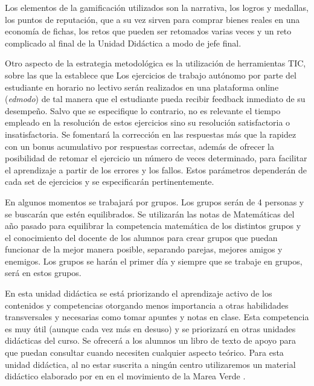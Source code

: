 Los elementos de la gamificación utilizados son la narrativa, los logros y medallas, los puntos de reputación, que a su vez sirven para comprar bienes reales en una economía de fichas, los retos que pueden ser retomados varias veces y un reto complicado al final de la Unidad Didáctica a modo de jefe final.



Otro aspecto de la estrategia metodológica es la utilización de herramientas \gls{TIC}, sobre las que la \lomce establece que 
%
Los ejercicios de trabajo autónomo por parte del estudiante en horario no lectivo serán realizados en una plataforma online (\textit{edmodo}) de tal manera que el estudiante pueda recibir feedback inmediato de su desempeño.
%
Salvo que se especifique lo contrario, no es relevante el tiempo empleado en la resolución de estos ejercicios sino su resolución satisfactoria o insatisfactoria.
%
Se fomentará la corrección en las respuestas más que la rapidez con un bonus acumulativo por respuestas correctas, además de ofrecer la posibilidad de retomar el ejercicio un número de veces determinado, para facilitar el aprendizaje a partir de los errores y los fallos.
%
Estos parámetros dependerán de cada set de ejercicios y se especificarán pertinentemente.

En algunos momentos se trabajará por grupos.
%
Los grupos serán de 4 personas y se buscarán que estén equilibrados.
%
Se utilizarán las notas de Matemáticas del año pasado para equilibrar la competencia matemática de los distintos grupos y el conocimiento del docente de los alumnos para crear grupos que puedan funcionar de la mejor manera posible, separando parejas, mejores amigos y enemigos.
%
\label{grupos}
%
Los grupos se harán el primer día y siempre que se trabaje en grupos, será en estos grupos.

En esta unidad didáctica se está priorizando el aprendizaje activo de los contenidos y competencias otorgando menos importancia a otras habilidades transversales y necesarias como tomar apuntes y notas en clase. 
%
Esta competencia es muy útil (aunque cada vez más en desuso) y se priorizará en otras unidades didácticas del curso. 
%
Se ofrecerá a los alumnos un libro de texto de apoyo para que puedan consultar cuando necesiten cualquier aspecto teórico.
%
Para esta unidad didáctica, al no estar suscrita a ningún centro utilizaremos un material didáctico elaborado por \citeauthor{MareaVerde} en \citeyear{MareaVerde} en el movimiento de la Marea Verde \citep{MareaVerde}.


